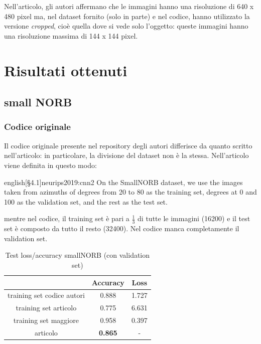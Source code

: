 \documentclass[italian,12pt,a4paper,oneside,final]{report}
\begin{document}
Nell'articolo, gli autori affermano che le immagini hanno una risoluzione di 640 x 480 pixel ma, nel dataset fornito (solo in parte) e nel codice, hanno utilizzato la versione \textit{cropped}, cioè quella dove si vede solo l'oggetto: queste immagini hanno una risoluzione massima di 144 x 144 pixel.
\section{Risultati ottenuti}

\subsection{small NORB}

\subsubsection{Codice originale}
Il codice originale presente nel repository degli autori differisce da quanto scritto nell'articolo: in particolare, la divisione del dataset non è la stessa.
Nell'articolo viene definita in questo modo:

\begin{foreigndisplaycquote}{english}[\S4.1]{neurips2019:cnn2}
On the SmallNORB dataset, we use the images taken from azimuths of degrees from 20 to 80 as the training set, degrees at 0 and 100 as the validation set, and the rest as the test set.
\end{foreigndisplaycquote}
mentre nel codice, il training set è pari a \(\frac{1}{3}\) di tutte le immagini (16200) e il test set è composto da tutto il resto (32400).
Nel codice manca completamente il validation set.
\begin{table}[!ht]
	\centering
	\begin{tabular}[t]{|c|cc|}
		\hline
		& \textbf{Accuracy} & \textbf{Loss} \\
		\hline
		training set codice autori& 0.888 & 1.727 \\
		training set articolo& 0.775 & 6.631 \\
		training set maggiore& 0.958 & 0.397 \\
		articolo & \textbf{0.865} & - \\
		\hline
	\end{tabular}
	\caption{Test loss/accuracy smallNORB (con validation set)}
	\label{tab:smallnorb_val_loss_acc}
\end{table}
\end{document}
